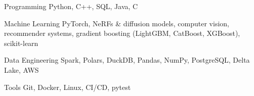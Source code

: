 

\begin{cvskills}

  \cvskill
    {Programming} %
    {Python, C++, SQL, Java, C} %

  \cvskill
    {Machine Learning} %
    {PyTorch, NeRFs \& diffusion models, computer vision, recommender systems, gradient boosting (LightGBM, CatBoost, XGBoost), scikit-learn} %

  \cvskill
    {Data Engineering} %
    {Spark, Polars, DuckDB, Pandas, NumPy, PostgreSQL, Delta Lake, AWS} %

  \cvskill
    {Tools} %
    {Git, Docker, Linux, CI/CD, pytest} %

\end{cvskills}
